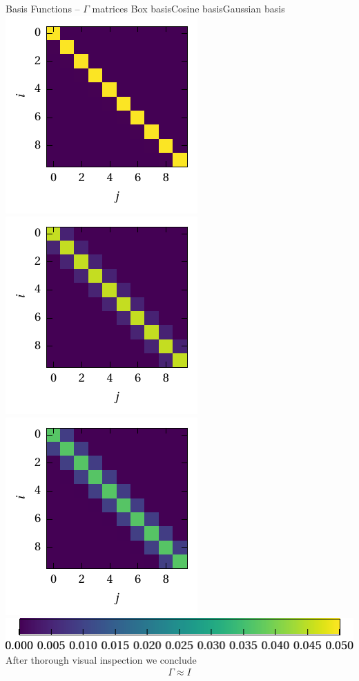 \documentclass[aspectratio=169]{beamer}
\begin{document}
\begin{frame}{Basis Functions -- $\Gamma$ matrices}
\centering
{\hspace{1cm}Box basis\hspace{2.25cm}Cosine basis\hspace{2cm}Gaussian basis}\\
\includegraphics[scale=0.85]{../media/basis_box_prod.pdf}
\includegraphics[scale=0.85]{../media/basis_cosine_prod.pdf}
\includegraphics[scale=0.85]{../media/basis_gaussian_prod.pdf}\\
\includegraphics[scale=0.85]{../media/inner_prod_cbar.pdf}\\[0.25cm]

After thorough visual inspection we conclude
\begin{align*}
\Gamma \approx I
\end{align*}
\end{frame}
\end{document}
